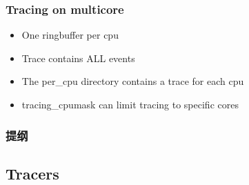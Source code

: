 \begin{frame}[fragile]
    \frametitle{Tracing on multicore}


    \begin{itemize}
        \item One ringbuffer per cpu
        \item Trace contains ALL events
        \item The per\_cpu directory contains a trace for each cpu
        \item tracing\_cpumask can limit tracing to specific cores
    \end{itemize}
% 
\end{frame}
\begin{frame}
\frametitle{提纲} %
\tableofcontents %
\end{frame}
\subsection{Tracers}

